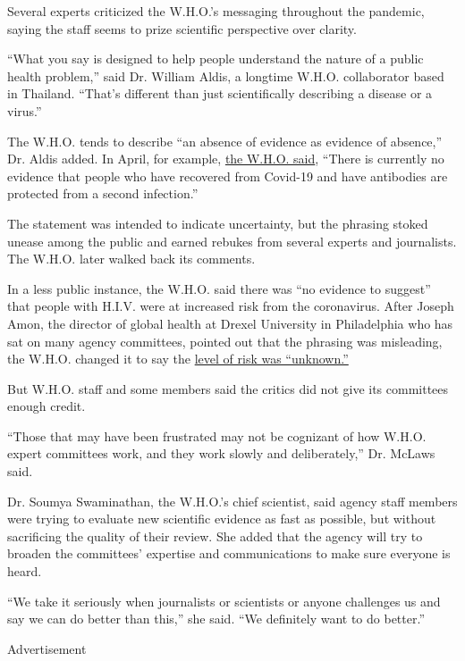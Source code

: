 Several experts criticized the W.H.O.'s messaging throughout the
pandemic, saying the staff seems to prize scientific perspective over
clarity.

``What you say is designed to help people understand the nature of a
public health problem,'' said Dr. William Aldis, a longtime W.H.O.
collaborator based in Thailand. ``That's different than just
scientifically describing a disease or a virus.''

The W.H.O. tends to describe ``an absence of evidence as evidence of
absence,'' Dr. Aldis added. In April, for example,
\href{https://www.reuters.com/article/us-health-coronavirus-who-idUSKCN2270FB}{the
W.H.O. said}, ``There is currently no evidence that people who have
recovered from Covid-19 and have antibodies are protected from a second
infection.''

The statement was intended to indicate uncertainty, but the phrasing
stoked unease among the public and earned rebukes from several experts
and journalists. The W.H.O. later walked back its comments.

In a less public instance, the W.H.O. said there was ``no evidence to
suggest'' that people with H.I.V. were at increased risk from the
coronavirus. After Joseph Amon, the director of global health at Drexel
University in Philadelphia who has sat on many agency committees,
pointed out that the phrasing was misleading, the W.H.O. changed it to
say the
\href{https://www.who.int/emergencies/diseases/novel-coronavirus-2019/question-and-answers-hub/q-a-detail/q-a-on-covid-19-hiv-and-antiretrovirals}{level
of risk was ``unknown.''}

But W.H.O. staff and some members said the critics did not give its
committees enough credit.

``Those that may have been frustrated may not be cognizant of how W.H.O.
expert committees work, and they work slowly and deliberately,'' Dr.
McLaws said.

Dr. Soumya Swaminathan, the W.H.O.'s chief scientist, said agency staff
members were trying to evaluate new scientific evidence as fast as
possible, but without sacrificing the quality of their review. She added
that the agency will try to broaden the committees' expertise and
communications to make sure everyone is heard.

``We take it seriously when journalists or scientists or anyone
challenges us and say we can do better than this,'' she said. ``We
definitely want to do better.''

Advertisement

